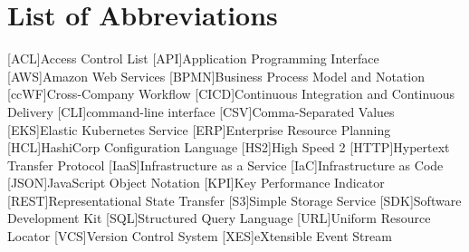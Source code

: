 \chapter*{List of Abbreviations}

\begin{acronym}[BPMN] %

	[ACL]{Access Control List}
	[API]{Application Programming Interface}
	[AWS]{Amazon Web Services}
	[BPMN]{Business Process Model and Notation}
	[ccWF]{Cross-Company Workflow}
	[CICD]{Continuous Integration and Continuous Delivery}
	[CLI]{command-line interface}
	[CSV]{Comma-Separated Values}
	[EKS]{Elastic Kubernetes Service}
	[ERP]{Enterprise Resource Planning}
	[HCL]{HashiCorp Configuration Language}
	[HS2]{High Speed 2}
	[HTTP]{Hypertext Transfer Protocol}
	[IaaS]{Infrastructure as a Service}
	[IaC]{Infrastructure as Code}
	[JSON]{JavaScript Object Notation}
	[KPI]{Key Performance Indicator}
	[REST]{Representational State Transfer}
	[S3]{Simple Storage Service}
	[SDK]{Software Development Kit}
	[SQL]{Structured Query Language}
	[URL]{Uniform Resource Locator}
	[VCS]{Version Control System}
	[XES]{eXtensible Event Stream}

\end{acronym}